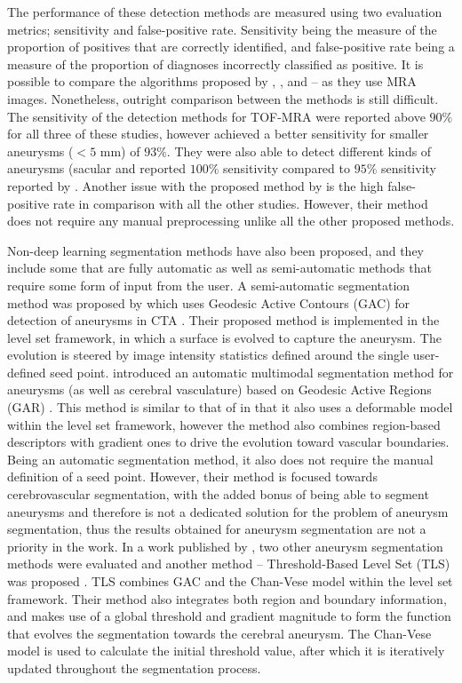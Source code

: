 The performance of these detection methods are measured using two evaluation metrics; sensitivity and false-positive rate. Sensitivity being the measure of the proportion of positives that are correctly identified, and false-positive rate being a measure of the proportion of diagnoses incorrectly classified as positive. It is possible to compare the algorithms proposed by \citeauthor{Hentschke2014}, \citeauthor{Suniaga2012}, and \citeauthor{Yang2011} -- as they use MRA images. Nonetheless, outright comparison between the methods is still difficult. The sensitivity of the detection methods for TOF-MRA were reported above $90\%$ for all three of these studies, however \citeauthor{Hentschke2014} achieved a better sensitivity for smaller aneurysms ($< 5$ mm) of $93\%$. They were also able to detect different kinds of aneurysms (sacular and\citeauthor{Lauric2010} reported $100\%$ sensitivity compared to $95\%$ sensitivity reported by \citeauthor{Hentschke2014}. Another issue with the proposed method by \citeauthor{Hentschke2014} is the high false-positive rate in comparison with all the other studies. However, their method does not require any manual preprocessing unlike all the other proposed methods.

Non-deep learning segmentation methods have also been proposed, and they include some that are fully automatic as well as semi-automatic methods that require some form of input from the user. A semi-automatic segmentation method was proposed by \citeauthor{Firouzian2011} which uses Geodesic Active Contours (GAC) for detection of aneurysms in CTA \cite{Firouzian2011}. Their proposed method is implemented in the level set framework, in which a surface is evolved to capture the aneurysm. The evolution is steered by image intensity statistics defined around the single user-defined seed point. \citeauthor{Bogunovic2011} introduced an automatic multimodal segmentation method for aneurysms (as well as cerebral vasculature) based on Geodesic Active Regions (GAR) \cite{Bogunovic2011}. This method is similar to that of \citeauthor{Firouzian2011} in that it also uses a deformable model within the level set framework, however the method also combines region-based descriptors with gradient ones to drive the evolution toward vascular boundaries. Being an automatic segmentation method, it also does not require the manual definition of a seed point. However, their method is focused towards cerebrovascular segmentation, with the added bonus of being able to segment aneurysms and therefore is not a dedicated solution for the problem of aneurysm segmentation, thus the results obtained for aneurysm segmentation are not a priority in the work. In a work published by \citeauthor{Sen2013}, two other aneurysm segmentation methods were evaluated and another method -- Threshold-Based Level Set (TLS) was proposed \cite{Sen2013}. TLS combines GAC and the Chan-Vese model \cite{Chan2001} within the level set framework. Their method also integrates both region and boundary information, and makes use of a global threshold and gradient magnitude to form the function that evolves the segmentation towards the cerebral aneurysm. The Chan-Vese model is used to calculate the initial threshold value, after which it is iteratively updated throughout the segmentation process. 

